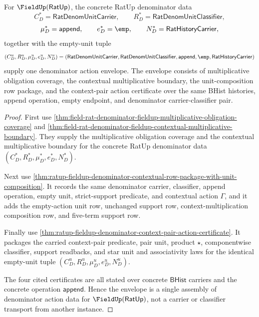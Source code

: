\begin{theorem}
\label{thm:ratup-fieldup-denominator-action-envelope-closure}
For $\FieldUp(\mathsf{RatUp})$, the concrete RatUp denominator data
$$
C_D^*=\mathsf{RatDenomUnitCarrier},\qquad
R_D^*=\mathsf{RatDenomUnitClassifier},
$$
$$
\mu_D^*=\mathsf{append},\qquad e_D^*=\emp,\qquad
N_D^*=\mathsf{RatHistoryCarrier},
$$
together with the empty-unit tuple
$$
(C_D^u,R_D^u,\mu_D^u,e_D^u,N_D^u)=
(\mathsf{RatDenomUnitCarrier},\mathsf{RatDenomUnitClassifier},
\mathsf{append},\emp,\mathsf{RatHistoryCarrier})
$$
supply one denominator action envelope. The envelope consists of
multiplicative obligation coverage, the contextual multiplicative boundary,
the unit-composition row package, and the context-pair action certificate over
the same BHist histories, append operation, empty endpoint, and denominator
carrier-classifier pair.
\end{theorem}
\begin{proof}
First use
\autoref{thm:field-rat-denominator-fieldup-multiplicative-obligation-coverage}
and
\autoref{thm:field-rat-denominator-fieldup-contextual-multiplicative-boundary}.
They supply the multiplicative obligation coverage and the contextual
multiplicative boundary for the concrete RatUp denominator data
$(C_D^*,R_D^*,\mu_D^*,e_D^*,N_D^*)$.

Next use
\autoref{thm:ratup-fieldup-denominator-contextual-row-package-with-unit-composition}.
It records the same denominator carrier, classifier, append operation, empty
unit, strict-support predicate, and contextual action $\Gamma$, and it adds the
empty-action unit row, unchanged support row, context-multiplication composition
row, and five-term support row.

Finally use
\autoref{thm:ratup-fieldup-denominator-context-pair-action-certificate}. It
packages the carried context-pair predicate, pair unit, product $\star$,
componentwise classifier, support readbacks, and star unit and associativity
laws for the identical empty-unit tuple
$(C_D^u,R_D^u,\mu_D^u,e_D^u,N_D^u)$.

The four cited certificates are all stated over concrete $\mathsf{BHist}$
carriers and the concrete operation $\mathsf{append}$. Hence the envelope is a
single assembly of denominator action data for $\FieldUp(\mathsf{RatUp})$,
not a carrier or classifier transport from another instance.
\end{proof}

